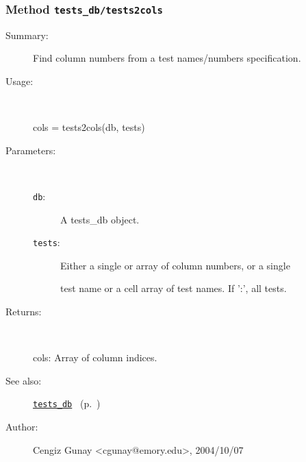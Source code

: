 \subsubsection[Method \texttt{tests2cols}]{Method \texttt{tests\_db/tests2cols}}%
%
\label{ref_tests_db__tests2cols}%
\hypertarget{ref_tests_db__tests2cols}{}%
\begin{description}
\item[Summary:]Find column numbers from a test names/numbers specification.
%
\item[Usage:]~%
\begin{lyxcode}%
cols = tests2cols(db, tests)
%
\end{lyxcode}%
%
%
\item[Parameters:]~
\begin{description}%
\item[\texttt{db}:]
 A tests\_db object.
\item[\texttt{tests}:]
 Either a single or array of column numbers, or a single

test name or a cell array of test names. If ':', all tests.\end{description}%
%
\item[Returns:]~

	cols: Array of column indices.
%
%
\item[See also:]%
\hyperlink{ref_tests_db}{\texttt{tests\_db}}%
\ (p.~\pageref{ref_tests_db})%
%
%
\item[Author:]%
Cengiz Gunay <cgunay@emory.edu>, 2004/10/07%
\end{description}
\methodline%
